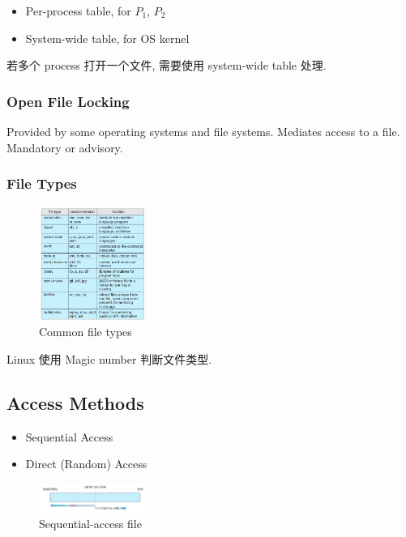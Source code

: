 \begin{itemize}
    \item Per-process table, for $P_1$, $P_2$
    \item System-wide table, for OS kernel
\end{itemize}

若多个 process 打开一个文件, 需要使用 system-wide table 处理. 

\subsubsection{Open File Locking}
Provided by some operating systems and file systems. Mediates access to a file. Mandatory or advisory. 

\subsubsection{File Types}
\begin{figure}[!htb]
    \centering
    \includegraphics[width=0.309\textwidth]{pic/OS10/Common file types}
    \caption{Common file types}
\end{figure}

Linux 使用 Magic number 判断文件类型. 

\subsection{Access Methods}
\begin{itemize}
    \item Sequential Access
    \item Direct (Random) Access
\end{itemize}

\begin{figure}[!htb]
    \centering
    \includegraphics[width=0.309\textwidth]{pic/OS10/Sequential-access file}
    \caption{Sequential-access file}
\end{figure}

